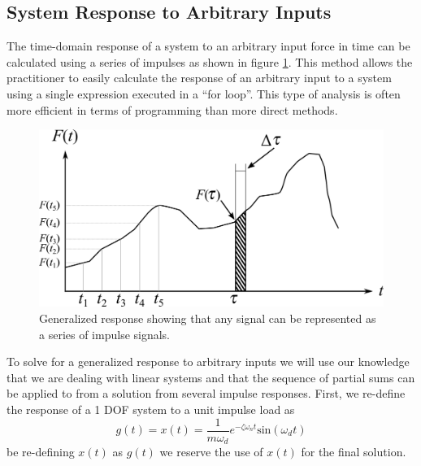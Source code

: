 \documentclass[12pt,letter]{article}
\begin{document}
\subsection{System Response to Arbitrary Inputs}

\label{sec:impulse_inputs}

The time-domain response of a system to an arbitrary input force in time can be calculated using a series of impulses as shown in figure \ref{fig:Arbitary_excitation_forces}. This method allows the practitioner to easily calculate the response of an arbitrary input to a system using a single expression executed in a ``for loop''. This type of analysis is often more efficient in terms of programming than more direct methods. 

\begin{figure}[H]
	\centering
	\includegraphics[]{../figures/Arbitary_excitation_forces.png}
	\caption{Generalized response showing that any signal can be represented as a series of impulse signals. }
	\label{fig:Arbitary_excitation_forces}
\end{figure}

To solve for a generalized response to arbitrary inputs we will use our knowledge that we are dealing with linear systems and that the sequence of partial sums can be applied to from a solution from several impulse responses. First, we re-define the response of a 1 DOF system to a unit impulse load as 
\begin{equation}
g(t) = x(t) =\frac{1}{m \omega_d} e^{-\zeta \omega_n t} \text{sin}(\omega_dt)
\label{eq:g_impulse_load_damped}
\end{equation}
be re-defining $x(t)$ as $g(t)$ we reserve the use of $x(t)$ for the final solution.
\end{document}
